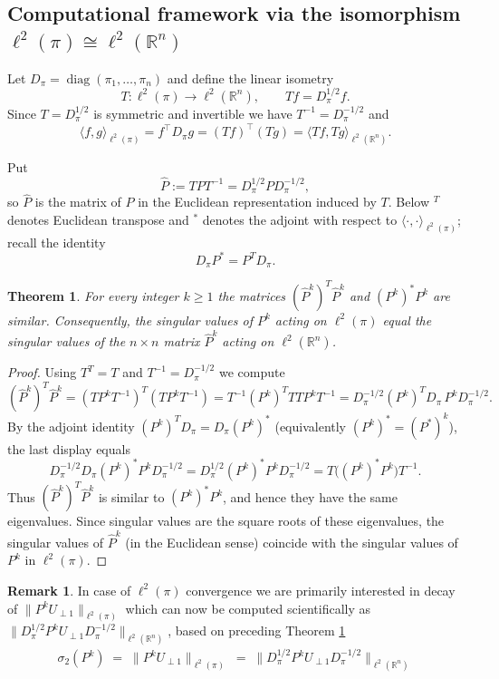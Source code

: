 \documentclass[preprint]{imsart}
\theoremstyle{plain}
\newtheorem{theorem}{Theorem}[section]
\theoremstyle{definition}
\newtheorem{remark}{Remark}
\begin{document}
\subsection{Computational framework via the isomorphism $\ell^{2}(\pi)\cong\ell^{2}(\mathbb{R}^n)$}
\label{subsec:iso_pi_n}

Let $D_\pi=\operatorname{diag}(\pi_1,\dots,\pi_n)$ and define the linear isometry
\[
T:\ell^2(\pi)\to\ell^2(\mathbb{R}^n),\qquad T f = D_\pi^{1/2} f .
\]
Since $T=D_\pi^{1/2}$ is symmetric and invertible we have $T^{-1}=D_\pi^{-1/2}$ and
\[
\langle f,g\rangle_{\ell^2(\pi)}=f^\top D_\pi g = (Tf)^\top (Tg)=\langle Tf,Tg\rangle_{\ell^2(\mathbb{R}^n)}.
\]

Put
\[
\hat P := T P T^{-1} = D_\pi^{1/2} P D_\pi^{-1/2},
\]
so $\hat P$ is the matrix of $P$ in the Euclidean representation induced by $T$.  Below $^T$ denotes Euclidean transpose and $^*$ denotes the adjoint with respect to $\langle\cdot,\cdot\rangle_{\ell^2(\pi)}$; recall the identity
\[
D_\pi P^* = P^T D_\pi.
\]

\begin{theorem}
\label{thm:similar_isomorphism}
For every integer $k\ge1$ the matrices $(\hat P^{k})^{T}\hat P^{k}$ and $(P^{k})^{*}P^{k}$ are similar. Consequently, the singular values of $P^{k}$ acting on $\ell^2(\pi)$ equal the singular values of the $n\times n$ matrix $\hat P^{k}$ acting on $\ell^2(\mathbb{R}^n)$. 
\end{theorem}

\begin{proof}
Using $T^T=T$ and $T^{-1}=D_\pi^{-1/2}$ we compute
\[
(\hat P^{k})^{T}\hat P^{k}
= (T P^{k} T^{-1})^{T}(T P^{k} T^{-1})
= T^{-1}(P^{k})^{T} T T P^{k} T^{-1}
= D_\pi^{-1/2} (P^{k})^{T} D_\pi\, P^{k} D_\pi^{-1/2}.
\]
By the adjoint identity $(P^{k})^{T} D_\pi = D_\pi (P^{k})^{*}$ (equivalently $(P^{k})^*=(P^*)^k$), the last display equals
\[
D_\pi^{-1/2} D_\pi (P^{k})^{*}P^{k} D_\pi^{-1/2} = D_\pi^{1/2} (P^{k})^{*}P^{k} D_\pi^{-1/2}
= T\big((P^{k})^{*}P^{k}\big)T^{-1}.
\]
Thus $(\hat P^{k})^{T}\hat P^{k}$ is similar to $(P^{k})^{*}P^{k}$, and hence they have the same eigenvalues. Since singular values are the square roots of these eigenvalues, the singular values of $\hat P^{k}$ (in the Euclidean sense) coincide with the singular values of $P^{k}$ in $\ell^2(\pi)$.
\end{proof}
\begin{remark}
In case of  $\ell^{2}(\pi)$ convergence we are primarily interested in decay of $\|P^{k}U_{\perp 1}\|_{\ell^{2}(\pi)}$ which can now be computed scientifically as $\big\|D_{\pi}^{1/2} P^{k} U_{\perp 1} D_{\pi}^{-1/2}\big\|_{\ell^{2}(\mathbb{R}^n)}$, based on preceding Theorem \ref{thm:similar_isomorphism}   
\begin{align}
\label{eq:sigma2-compute}
\sigma_2(P^{k}) \;=\; \|P^{k} U_{\perp 1}\|_{\ell^{2}(\pi)}
\;=\; \big\|D_{\pi}^{1/2} P^{k} U_{\perp 1} D_{\pi}^{-1/2}\big\|_{\ell^{2}(\mathbb{R}^n)}
\end{align}    
\end{remark}
\end{document}
